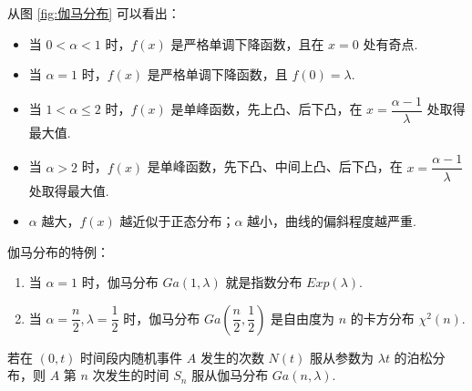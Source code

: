 从图 \ref{fig:伽马分布} 可以看出：
\begin{itemize}
    \item 当 $0 < \alpha < 1$ 时，$f(x)$ 是严格单调下降函数，且在 $x=0$ 处有奇点.
    \item 当 $\alpha = 1$ 时，$f(x)$ 是严格单调下降函数，且 $f(0) = \lambda$.
    \item 当 $1 < \alpha \leqslant 2$ 时，$f(x)$ 是单峰函数，先上凸、后下凸，在 $x = \dfrac{\alpha - 1}{\lambda}$ 处取得最大值.
    \item 当 $\alpha > 2$ 时，$f(x)$ 是单峰函数，先下凸、中间上凸、后下凸，在 $x = \dfrac{\alpha - 1}{\lambda}$ 处取得最大值.
    \item $\alpha$ 越大，$f(x)$ 越近似于正态分布；$\alpha$ 越小，曲线的偏斜程度越严重.
\end{itemize}

伽马分布的特例：
\begin{enumerate}
    \item 当 $\alpha = 1$ 时，伽马分布 $Ga(1, \lambda)$ 就是指数分布 $Exp(\lambda)$.
    \item 当 $\alpha = \dfrac{n}{2}, \lambda = \dfrac{1}{2}$ 时，伽马分布 $Ga(\dfrac{n}{2}, \dfrac{1}{2})$ 是自由度为 $n$ 的卡方分布 $\chi^2(n)$.
\end{enumerate}

\begin{conclusion}[][泊松分布与伽马分布的关系]
    \indent 若在 $(0,t)$ 时间段内随机事件 $A$ 发生的次数 $N(t)$ 服从参数为 $\lambda t$ 的泊松分布，则 $A$ 第 $n$ 次发生的时间 $S_n$ 服从伽马分布 $Ga(n, \lambda)$.
\end{conclusion}

